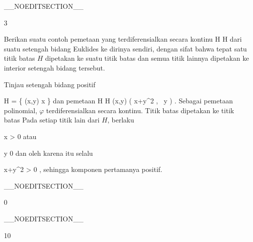 __NOEDITSECTION__

{3}

{

Berikan suatu contoh pemetaan yang terdiferensialkan secara kontinu
\maabbdisp {\varphi} { H } { H
} {}
dari suatu setengah bidang Euklides ke dirinya sendiri, dengan sifat bahwa tepat satu titik batas $H$ dipetakan ke suatu titik batas dan semua titik lainnya dipetakan ke interior setengah bidang tersebut.

}
{

Tinjau setengah bidang positif

\mavergleichskettedisp
{\vergleichskette
{ H
}
{ =} { \left\{ (x,y)  \mid   x         \right\}
}
{ } {
}
{ } {
}
{ } {
}
}
{}{}{}
dan pemetaan
\maabbeledisp {\varphi} { H } {H
} {(x,y)} { \left(  x+y^2  , \,   y                   \right)
} {.}
Sebagai pemetaan polinomial, $\varphi$ terdiferensialkan secara kontinu. Titik batas
 dipetakan ke titik batas
 Pada setiap titik lain dari $H$, berlaku

\mavergleichskette
{\vergleichskette
{ x
}
{ > }{  0
}
{  }{
}
{    }{
}
{   }{
}
}
{}{}{}
atau

\mavergleichskette
{\vergleichskette
{ y
}
{ \neq }{ 0
}
{  }{
}
{    }{
}
{   }{
}
}
{}{}{}
dan oleh karena itu selalu

\mavergleichskettedisp
{\vergleichskette
{ x+y^2
}
{ >} {  0
}
{ } {
}
{ } {
}
{ } {
}
}
{}{}{,}
sehingga komponen pertamanya positif.

 }

__NOEDITSECTION__

{0}

{

}
{  }

__NOEDITSECTION__

{10}


